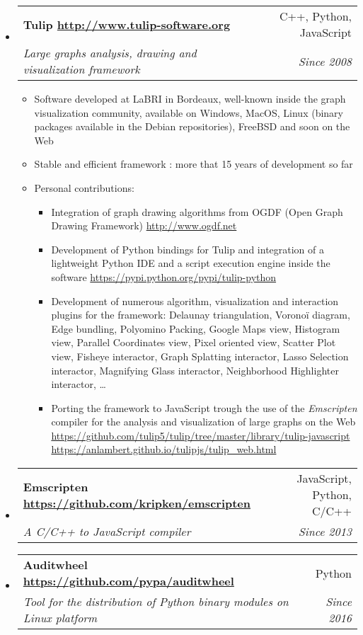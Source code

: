 \documentclass[letterpaper,11pt]{article}
\makeatletter
\newcommand{\ressubheading}[4]{
\begin{tabular*}{6.5in}{l@{\cftdotfill{\cftsecdotsep}\extracolsep{\fill}}r}
    \textbf{#1} & #2 \\
    \textit{#3} & \textit{#4} \\
\end{tabular*}\vspace{-6pt}}
\makeatother
\begin{document}
\begin{itemize}

\item \ressubheading{Tulip \url{http://www.tulip-software.org}}{C++, Python, JavaScript}{Large graphs analysis, drawing and visualization framework}{Since 2008}

\begin{itemize}
  \item Software developed at LaBRI in Bordeaux, well-known inside the graph visualization community, available on Windows, MacOS, Linux (binary packages available in the Debian repositories), FreeBSD and soon on the Web
  \item Stable and efficient framework : more that 15 years of development so far
  \item Personal contributions:
  \begin{itemize}
    \item Integration of graph drawing algorithms from OGDF (Open Graph Drawing Framework) \url{http://www.ogdf.net}
    \item Development of Python bindings for Tulip and integration of a lightweight Python IDE and a script execution engine inside the software \url{https://pypi.python.org/pypi/tulip-python}
    \item Development of numerous algorithm, visualization and interaction plugins for the framework: Delaunay triangulation, Voronoï diagram, Edge bundling, Polyomino Packing, Google Maps view, Histogram view, Parallel Coordinates view, Pixel oriented view, Scatter Plot view, Fisheye interactor, Graph Splatting interactor, Lasso Selection interactor, Magnifying Glass interactor, Neighborhood Highlighter interactor, \ldots
    \item Porting the framework to JavaScript trough the use of the \emph{Emscripten} compiler for the analysis and visualization of large graphs on the Web \url{https://github.com/tulip5/tulip/tree/master/library/tulip-javascript} \url{https://anlambert.github.io/tulipjs/tulip_web.html}
  \end{itemize}
\end{itemize}

\item \ressubheading{Emscripten \url{https://github.com/kripken/emscripten}}{JavaScript, Python, C/C++}{A C/C++ to JavaScript compiler}{Since 2013}

\item \ressubheading{Auditwheel \url{https://github.com/pypa/auditwheel}}{Python}{Tool for the distribution of Python binary modules on Linux platform}{Since 2016}

\end{itemize}
\end{document}
